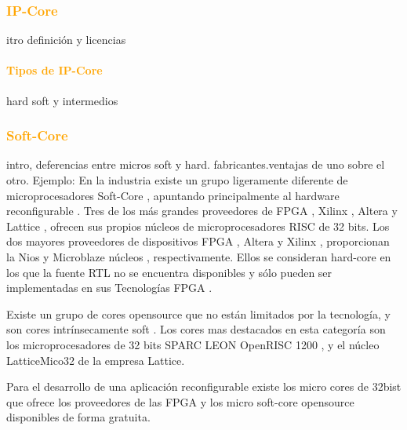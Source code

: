 \documentclass[a4paper,11pt]{article}
\begin{document}
		\subsubsection{\textcolor{orange}{ IP-Core}}
itro definición y licencias
			\paragraph{\textcolor{orange}{ Tipos de IP-Core}}
hard soft y intermedios

		\subsubsection{\textcolor{orange}{Soft-Core}}%
 intro,  deferencias entre micros soft y hard. fabricantes.ventajas de uno sobre el otro.
 Ejemplo:
En la industria existe un grupo ligeramente diferente de microprocesadores  Soft-Core , apuntando principalmente al hardware reconfigurable . Tres de los más grandes proveedores de FPGA , Xilinx , Altera y Lattice , ofrecen sus propios núcleos de microprocesadores RISC de 32 bits. Los dos mayores proveedores de dispositivos FPGA , Altera y Xilinx , proporcionan la Nios y Microblaze núcleos , respectivamente. Ellos se consideran hard-core en los que la fuente RTL no se encuentra  disponibles y sólo pueden ser implementadas en sus  Tecnologías FPGA .

Existe un grupo de cores opensource que no están limitados por la tecnología, y
son cores intrínsecamente soft . Los cores mas destacados en esta categoría son los  microprocesadores de 32 bits  SPARC LEON OpenRISC 1200 , y el núcleo LatticeMico32 de la empresa Lattice.

Para el desarrollo de una aplicación reconfigurable existe los micro cores de 32bist que ofrece los proveedores de las FPGA y los micro soft-core opensource disponibles de forma gratuita.
\end{document}
